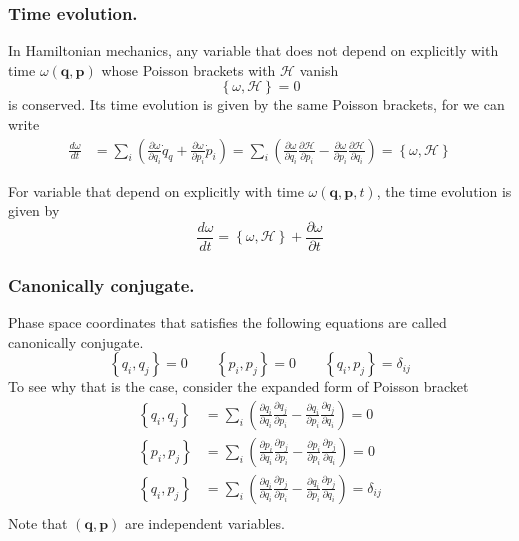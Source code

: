 \documentclass[../../../main.tex]{subfiles}
\begin{document}
\subsubsection*{Time evolution.}
In Hamiltonian mechanics, any variable that does not depend on explicitly with time $\omega(\mathbf{q},\mathbf{p}) 	$ whose Poisson brackets with $\mathcal{H }$ vanish
\begin{equation*}
	\left\{ \omega,\mathcal{H } \right\}=0
\end{equation*}
is conserved.
Its time evolution is given by the same Poisson brackets, for we can write
\begin{align*}
	\frac{d \omega}{dt} & = \sum_i \left( \frac{\partial \omega }{\partial q_i }\dot{q}_q+\frac{\partial \omega }{\partial p_i}\dot{p}_i \right) = \sum_i \left( \frac{\partial \omega }{\partial q_i }\frac{\partial \mathcal{H}}{\partial p_i 	}-\frac{\partial\omega }{\partial p_i }\frac{\partial \mathcal{H }}{\partial q_i } \right) =\left\{ \omega,\mathcal{H} \right\}
\end{align*}

For variable that depend on explicitly with time $\omega(\mathbf{q}, \mathbf{p },t )$, the time evolution is given by
\begin{equation*}
	\frac{d \omega }{dt}=\left\{ \omega,\mathcal{H } \right\}+\frac{\partial \omega }{\partial t}
\end{equation*}

\subsubsection*{Canonically conjugate.}
Phase space coordinates that satisﬁes the following equations are called canonically conjugate.
\begin{equation*}
	\left\{ q_i,q_j  \right\}=0\qquad \left\{ p_i,p_j  \right\}=0\qquad \left\{ q_i,p_j  \right\}=\delta_{ij}
\end{equation*}
To see why that is the case, consider the expanded form of Poisson bracket
\begin{align*}
	\left\{ q_i,q_j  \right\} & = \sum_i \left( \frac{\partial q_i}{\partial q_i }\frac{\partial q_j }{\partial p_i }-\frac{\partial q_i }{\partial p_i }\frac{\partial q_j }{\partial q_i} \right) =0           \\
	\left\{ p_i,p_j  \right\} & = \sum_i \left( \frac{\partial p_i}{\partial q_i }\frac{\partial p_j }{\partial p_i }-\frac{\partial p_i }{\partial p_i }\frac{\partial p_j }{\partial q_i} \right) =0           \\
	\left\{ q_i,p_j  \right\} & = \sum_i \left( \frac{\partial q_i}{\partial q_i }\frac{\partial p_j }{\partial p_i }-\frac{\partial q_i }{\partial p_i }\frac{\partial p_j }{\partial q_i} \right) =\delta_{ij} \\
\end{align*}
Note that $(\mathbf{q },\mathbf{p })$ are independent variables.
\end{document}
